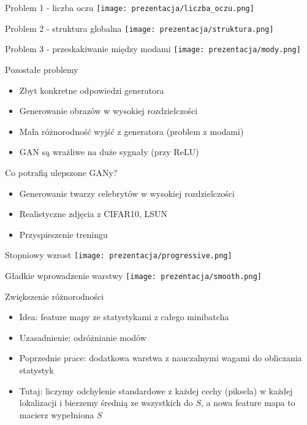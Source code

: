 \documentclass[11pt]{beamer}
\begin{document}
\begin{frame}{Problem 1 - liczba oczu}
\minipage{\textwidth}
\texttt{[image: prezentacja/liczba\_oczu.png]}
\endminipage
\end{frame}

\begin{frame}{Problem 2 - struktura globalna}
\minipage{\textwidth}
\texttt{[image: prezentacja/struktura.png]}
\endminipage
\end{frame}


\begin{frame}{Problem 3 - przeskakiwanie między modami}
\minipage{\textwidth}
\texttt{[image: prezentacja/mody.png]}
\endminipage
\end{frame}
    

\begin{frame}{Pozostałe problemy}
\begin{itemize}
    \item Zbyt konkretne odpowiedzi generatora
    \item Generowanie obrazów w wysokiej rozdzielczości
    \item Mała różnorodność wyjść z generatora (problem z modami)
    \item GAN są wrażliwe na duże sygnały (przy ReLU)
\end{itemize}
\end{frame}

\begin{frame}{Co potrafią ulepszone GANy?}
\begin{itemize}
    \item Generowanie twarzy celebrytów w wysokiej rozdzielczości
    \item Realistyczne zdjęcia z CIFAR10, LSUN
    \item Przyspieszenie treningu
\end{itemize}
\end{frame}

\begin{frame}{Stopniowy wzrost}
\minipage{\textwidth}
\texttt{[image: prezentacja/progressive.png]}
\endminipage
\end{frame}

\begin{frame}{Gładkie wprowadzenie warstwy}
\minipage{\textwidth}
\texttt{[image: prezentacja/smooth.png]}
\endminipage
\end{frame}

\begin{frame}{Zwiększenie różnorodności}
\begin{itemize}
    \item Idea: feature mapy ze statystykami z całego minibatcha 
    \item Uzasadnienie: odróżnianie modów
    \item Poprzednie prace: dodatkowa warstwa z nauczalnymi wagami do obliczania statystyk
    \item Tutaj: liczymy odchylenie standardowe z każdej cechy (piksela) w każdej lokalizacji i bierzemy średnią ze wszystkich do $S$, a nowa feature mapa to macierz wypełniona $S$
\end{itemize}
\end{frame}
\end{document}
